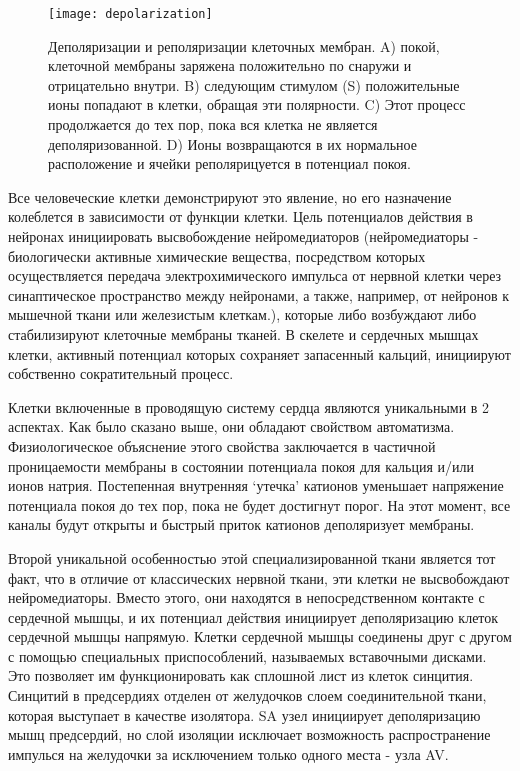 \begin{figure}[h]
	\begin{center}
		\texttt{[image: depolarization]}
		\caption{Деполяризации и реполяризации клеточных мембран.
			A) покой, клеточной мембраны заряжена положительно по
			снаружи и отрицательно внутри. B) следующим стимулом
			(S) положительные ионы попадают в клетки, обращая эти полярности. C)
			Этот процесс продолжается до тех пор, пока вся клетка не является деполяризованной. D)
			Ионы возвращаются в их нормальное расположение и ячейки реполярицуется в потенциал покоя.}
		\label{ris:depolarization}
	\end{center}
\end{figure}

Все человеческие клетки демонстрируют это явление, но его назначение колеблется в зависимости от функции клетки. Цель потенциалов действия в нейронах инициировать высвобождение нейромедиаторов (нейромедиаторы - биологически активные химические вещества, посредством которых осуществляется передача электрохимического импульса от нервной клетки через синаптическое пространство между нейронами, а также, например, от нейронов к мышечной ткани или железистым клеткам.), которые либо возбуждают либо стабилизируют клеточные мембраны тканей. В скелете и сердечных мышцах клетки, активный потенциал которых сохраняет запасенный кальций, инициируют собственно сократительный процесс.

Клетки включенные в проводящую систему сердца являются уникальными в 2 аспектах. Как было сказано выше, они обладают свойством автоматизма. Физиологическое объяснение этого свойства заключается в частичной проницаемости мембраны в состоянии потенциала покоя для кальция и/или ионов натрия. Постепенная внутренняя ‘утечка’ катионов уменьшает напряжение потенциала покоя до тех пор, пока не будет достигнут порог. На этот момент, все каналы будут открыты и быстрый приток катионов деполяризует мембраны.

Второй уникальной особенностью этой специализированной ткани является тот факт, что в отличие от классических нервной ткани, эти клетки не высвобождают нейромедиаторы. Вместо этого, они находятся в непосредственном контакте с сердечной мышцы, и их потенциал действия инициирует деполяризацию клеток сердечной мышцы напрямую.
Клетки сердечной мышцы соединены друг с другом с помощью специальных приспособлений, называемых вставочными дисками. Это позволяет им функционировать как сплошной лист из клеток синцития. Синцитий в предсердиях отделен от желудочков слоем соединительной ткани, которая выступает в качестве изолятора. SA узел инициирует деполяризацию мышц предсердий, но слой изоляции исключает возможность распространение импулься на желудочки за исключением только одного места - узла AV. 

